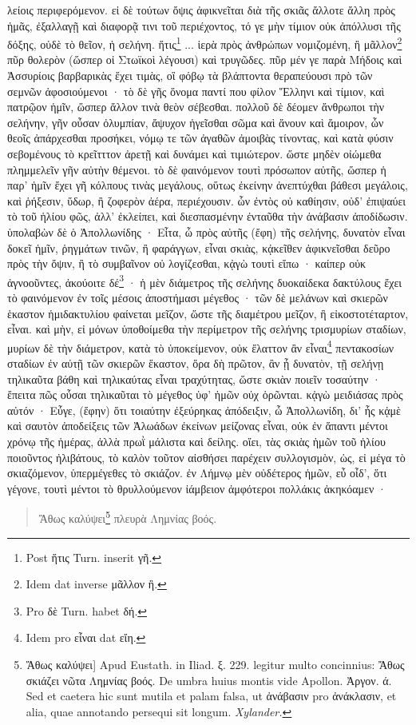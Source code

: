 \documentclass[a4paper, 11pt, oneside, polutonikogreek, german]{article}
\begin{document}
λείοις περιφερόμενον. εἰ δὲ τούτων ὄψις ἀφικνεῖται διὰ τῆς σκιᾶς ἄλλοτε ἄλλη πρὸς ἡμᾶς, ἐξαλλαγῇ καὶ διαφορᾷ τινι τοῦ περιέχοντος, τό γε μὴν τίμιον οὐκ ἀπόλλυσι τῆς δόξης, οὐδὲ τὸ θεῖον, ἡ σελήνη. ἥτις\footnote{Post ἥτις Turn. inserit γῆ.} ... ἱερὰ πρὸς ἀνθρώπων νομιζομένη, ἢ μᾶλλον\footnote{Idem dat inverse μᾶλλον ἢ.} πῦρ θολερὸν (ὥσπερ οἱ Στωϊκοὶ λέγουσι) καὶ τρυγῶδες. πῦρ μέν γε παρὰ Μήδοις καὶ Ἀσσυρίοις βαρβαρικὰς ἔχει τιμὰς, οἳ φόβῳ τὰ βλάπτοντα θεραπεύουσι πρὸ τῶν σεμνῶν ἀφοσιούμενοι · τὸ δὲ γῆς ὄνομα παντί που φίλον Ἕλληνι καὶ τίμιον, καὶ πατρῷον ἡμῖν, ὥσπερ ἄλλον τινὰ θεὸν σέβεσθαι. πολλοῦ δὲ δέομεν ἄνθρωποι τὴν σελήνην, γῆν οὖσαν ὀλυμπίαν, ἄψυχον ἡγεῖσθαι σῶμα καὶ ἄνουν καὶ ἄμοιρον, ὧν θεοῖς ἀπάρχεσθαι προσήκει, νόμῳ τε τῶν ἀγαθῶν ἀμοιβὰς τίνοντας, καὶ κατὰ φύσιν σεβομένους τὸ κρεῖτττον ἀρετῇ καὶ δυνάμει καὶ τιμιώτερον. ὥστε μηδὲν οἰώμεθα πλημμελεῖν γῆν αὐτὴν θέμενοι. τὸ δὲ φαινόμενον τουτὶ πρόσωπον αὐτῆς, ὥσπερ ἡ παρ' ἡμῖν ἔχει γῆ κόλπους τινὰς μεγάλους, οὕτως ἐκείνην ἀνεπτύχθαι βάθεσι μεγάλοις, καὶ ῥήξεσιν, ὕδωρ, ἢ ζοφερὸν ἀέρα, περιέχουσιν. ὧν ἐντὸς οὐ καθίησιν, οὐδ' ἐπιψαύει τὸ τοῦ ἡλίου φῶς, ἀλλ' ἐκλείπει, καὶ διεσπασμένην ἐνταῦθα τὴν ἀνάβασιν ἀποδίδωσιν. ὑπολαβὼν δὲ ὁ Ἀπολλωνίδης · Εἶτα, ὦ πρὸς αὐτῆς (ἔφη) τῆς σελήνης, δυνατὸν εἶναι δοκεῖ ἡμῖν, ῥηγμάτων τινῶν, ἢ φαράγγων, εἶναι σκιὰς, κᾀκεῖθεν ἀφικνεῖσθαι δεῦρο πρὸς τὴν ὄψιν, ἢ τὸ συμβαῖνον οὐ λογίζεσθαι, κᾀγὼ τουτὶ εἴπω · καίπερ οὐκ ἀγνοοῦντες, ἀκούοιτε δέ\footnote{Pro δὲ Turn. habet δή.} · ἡ μὲν διάμετρος τῆς σελήνης δυοκαίδεκα δακτύλους ἔχει τὸ φαινόμενον ἐν τοῖς μέσοις ἀποστήμασι μέγεθος · τῶν δὲ μελάνων καὶ σκιερῶν ἑκαστον ἡμιδακτυλίου φαίνεται μεῖζον, ὥστε τῆς διαμέτρου μεῖζον, ἢ εἰκοστοτέταρτον, εἶναι. καὶ μὴν, εἰ μόνων ὑποθοίμεθα τὴν περίμετρον τῆς σελήνης τρισμυρίων σταδίων, μυρίων δὲ τὴν διάμετρον, κατὰ τὸ ὑποκείμενον, οὐκ ἔλαττον ἂν εἶναι\footnote{Idem pro εἶναι dat εἴη.} πεντακοσίων σταδίων ἐν αὐτῇ τῶν σκιερῶν ἕκαστον, ὅρα δὴ πρῶτον, ἂν ᾖ δυνατὸν, τῇ σελήνῃ τηλικαῦτα βάθη καὶ τηλικαύτας εἶναι τραχύτητας, ὥστε σκιὰν ποιεῖν τοσαύτην · ἔπειτα πῶς οὖσαι τηλικαῦται τὸ μέγεθος ὑφ' ἡμῶν οὐχ ὁρῶνται. κᾀγὼ μειδιάσας πρὸς αὐτόν · Εὖγε, (ἔφην) ὅτι τοιαύτην ἐξεύρηκας ἀπόδειξιν, ὦ Ἀπολλωνίδη, δι' ἧς κᾀμὲ καὶ σαυτὸν ἀποδείξεις τῶν Ἀλωάδων ἐκείνων μείζονας εἶναι, οὐκ ἐν ἅπαντι μέντοι χρόνῳ τῆς ἡμέρας, ἀλλὰ πρωῒ μάλιστα καὶ δείλης. οἴει, τὰς σκιὰς ἡμῶν τοῦ ἡλίου ποιοῦντος ἠλιβάτους, τὸ καλὸν τοῦτον αἰσθήσει παρέχειν συλλογισμὸν, ὡς, εἰ μέγα τὸ σκιαζόμενον, ὑπερμέγεθες τὸ σκιάζον. ἐν Λήμνῳ μὲν οὐδέτερος ἡμῶν, εὖ οἶδ', ὅτι γέγονε, τουτὶ μέντοι τὸ θρυλλούμενον ἰάμβειον ἀμφότεροι πολλάκις ἀκηκόαμεν ·
\begin{quotation}\small
Ἄθως καλύψει\footnote{Ἄθως καλύψει] Apud Eustath. in Iliad. ξ. 229. legitur multo concinnius: Ἄθως σκιάζει νῶτα Λημνίας βοός. De umbra huius montis vide Apollon. Ἀργον. ά. Sed et caetera hic sunt mutila et palam falsa, ut ἀνάβασιν pro ἀνάκλασιν, et alia, quae annotando persequi sit longum. \emph{Xylander.}} πλευρὰ Λημνίας βοός.
\end{quotation}
\end{document}

